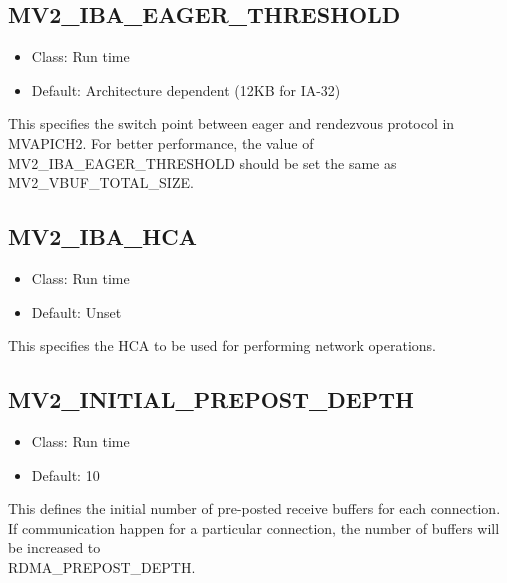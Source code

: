 \subsection{MV2\_IBA\_EAGER\_THRESHOLD}
\label{def:nem-rdma-iba-eager-threshold}

\begin{itemize}
    \item Class: Run time

    \item Default: Architecture dependent (12KB for IA-32)
\end{itemize}

This specifies the switch point between eager and rendezvous
protocol in MVAPICH2. For better performance, the value of 
MV2\_IBA\_EAGER\_THRESHOLD should be
set the same as MV2\_VBUF\_TOTAL\_SIZE.

\subsection{MV2\_IBA\_HCA}
\label{def:nem-rdma-iba-hca}

\begin{itemize}
    \item Class: Run time

    \item Default: Unset
\end{itemize}

This specifies the HCA to be used for performing network operations.

\subsection{MV2\_INITIAL\_PREPOST\_DEPTH}
\label{def:nem-viadev-initial-prepost-depth}

\begin{itemize}
    \item Class: Run time

    \item Default: 10
\end{itemize}

This defines the initial number of pre-posted receive buffers for each
connection. If communication happen for a particular connection, the
number of buffers will be increased to \\RDMA\_PREPOST\_DEPTH.

